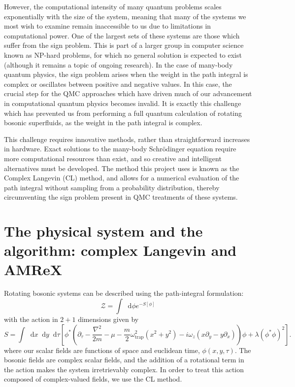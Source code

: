 \documentclass[onecolumn, 12pt]{report}
\newcommand{\beq}{\begin{equation}}
\newcommand{\eeq}{\end{equation}}
\def\CZ{{\mathcal Z}}
\def\del{{\nabla}}
\newcommand*\dif{\mathop{}\!\mathrm{d}}
\begin{document}
However, the computational intensity of many quantum problems scales exponentially with the size of the system, meaning that many of the systems we most wish to examine remain inaccessible to us due to limitations in computational power. One of the largest sets of these systems are those which suffer from the sign problem. This is part of a larger group in computer science known as NP-hard problems, for which no general solution is expected to exist (although it remains a topic of ongoing research). In the case of many-body quantum physics, the sign problem  arises when the weight in the path integral is complex or oscillates between positive and negative values. In this case, the crucial step for the QMC approaches which have driven much of our advancement in computational quantum physics becomes invalid. It is exactly this challenge which has prevented us from performing a full quantum calculation of rotating bosonic superfluids, as the weight in the path integral is complex.

This challenge requires innovative methods, rather than straightforward increases in hardware. Exact solutions to the many-body Schr\"{o}dinger equation require more computational resources than exist, and so creative and intelligent alternatives must be developed. The method this project uses is known as the Complex Langevin (CL) method, and allows for a numerical evaluation of the path integral without sampling from a probability distribution, thereby circumventing the sign problem present in QMC treatments of these systems. 


\section{The physical system and the algorithm: complex Langevin and AMReX}
Rotating bosonic systems can be described using the path-integral formulation:
%
\beq
\CZ = \int \dif \phi e^{-S[\phi]}
\eeq
%
with the action in $2+1$ dimensions given by
%
\beq
S = \int \dif x \dif y \dif\tau \left[ \phi^{*}\left( \partial_{\tau} - \frac{\del^{2}}{2m} - \mu  - \frac{m}{2} \omega_{\text{trap}}^{2}(x^{2}+y^{2})- i \omega_{z}(x \partial_{y} - y\partial_{x})\right)\phi + \lambda (\phi^{*} \phi)^{2}\right].
\eeq 
%
where our scalar fields are functions of space and euclidean time, $\phi(x,y,\tau)$. The bosonic fields are complex scalar fields, and the addition of a rotational term in the action makes the system irretrievably complex. In order to treat this action composed of complex-valued fields, we use the CL method. 
\end{document}
